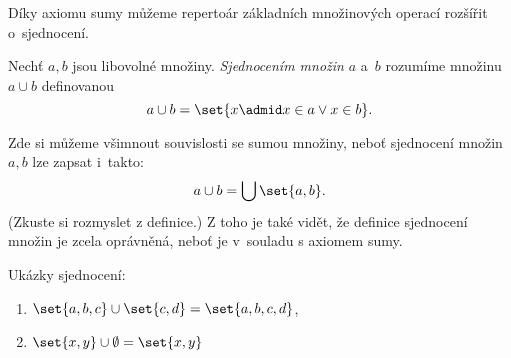 Díky axiomu sumy můžeme repertoár základních množinových operací rozšířit o~sjednocení.
\begin{definition}\label{def:sjednoceni}
    Nechť $a,b$ jsou libovolné množiny. \emph{Sjednocením množin} $a$ a~$b$ rozumíme množinu $a\cup b$ definovanou
    \begin{equation*}
        a\cup b=\set{x \admid x\in a \lor x\in b}.
    \end{equation*}
\end{definition}
Zde si můžeme všimnout souvislosti se sumou množiny, neboť sjednocení množin $a,b$ lze zapsat i~takto:
\begin{equation*}
    a\cup b=\bigcup\set{a,b}.
\end{equation*}
(Zkuste si rozmyslet z definice.) Z toho je také vidět, že definice sjednocení množin je zcela oprávněná, neboť je v~souladu s axiomem sumy.
\begin{example}
    Ukázky sjednocení:
    \begin{enumerate}[label=(\roman*)]
        \item $\set{a,b,c}\cup\set{c,d}=\set{a,b,c,d}$,
        \item $\set{x,y}\cup\emptyset=\set{x,y}$
    \end{enumerate}
\end{example}

